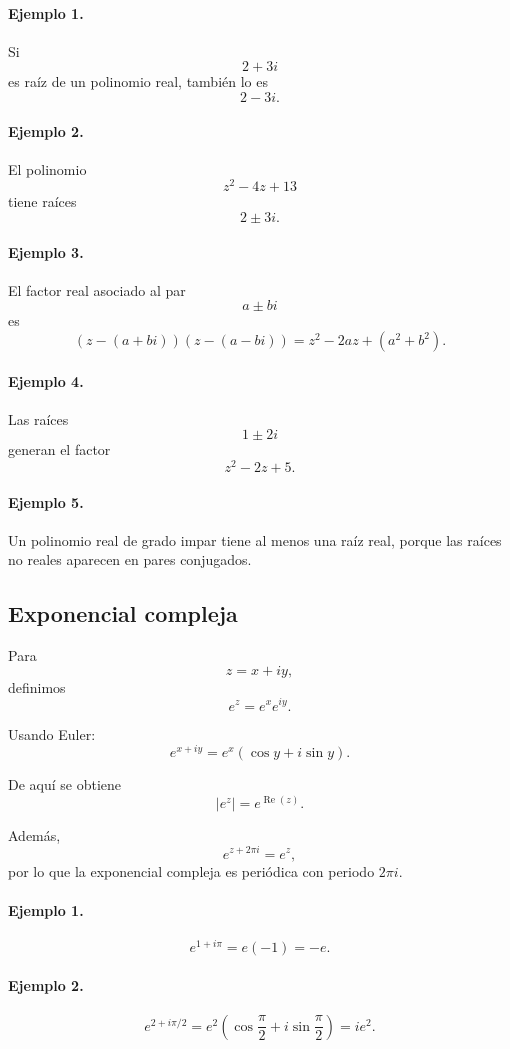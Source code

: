 \paragraph{Ejemplo 1.}
Si
\[
2+3i
\]
es raíz de un polinomio real, también lo es
\[
2-3i.
\]

\paragraph{Ejemplo 2.}
El polinomio
\[
z^2-4z+13
\]
tiene raíces
\[
2\pm3i.
\]

\paragraph{Ejemplo 3.}
El factor real asociado al par
\[
a\pm bi
\]
es
\[
(z-(a+bi))(z-(a-bi))
=
z^2-2az+(a^2+b^2).
\]

\paragraph{Ejemplo 4.}
Las raíces
\[
1\pm2i
\]
generan el factor
\[
z^2-2z+5.
\]

\paragraph{Ejemplo 5.}
Un polinomio real de grado impar tiene al menos una raíz real, porque las
raíces no reales aparecen en pares conjugados.

\subsection{Exponencial compleja}

Para
\[
z=x+iy,
\]
definimos
\[
e^z
=
e^x e^{iy}.
\]

Usando Euler:
\[
\boxed{
e^{x+iy}
=
e^x(\cos y+i\sin y).
}
\]

De aquí se obtiene
\[
\boxed{|e^z|=e^{\operatorname{Re}(z)}.}
\]

Además,
\[
e^{z+2\pi i}=e^z,
\]
por lo que la exponencial compleja es periódica con periodo $2\pi i$.

\paragraph{Ejemplo 1.}
\[
e^{1+i\pi}
=
e(-1)
=
-e.
\]

\paragraph{Ejemplo 2.}
\[
e^{2+i\pi/2}
=
e^2\left(\cos\frac{\pi}{2}+i\sin\frac{\pi}{2}\right)
=
ie^2.
\]

